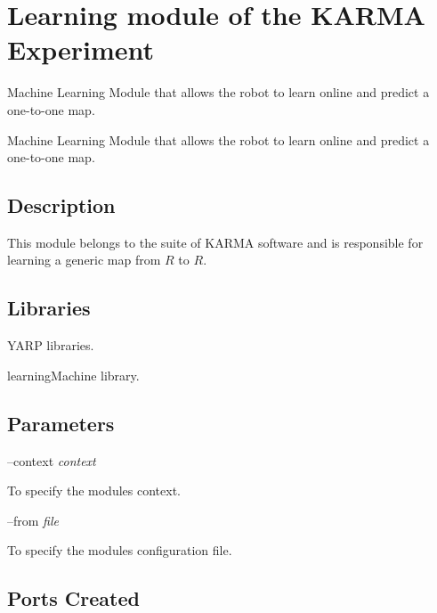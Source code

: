 \section{Learning module of the K\+A\+R\+MA Experiment}
\label{group__karmaLearn}


Machine Learning Module that allows the robot to learn online and predict a one-\/to-\/one map.  


Machine Learning Module that allows the robot to learn online and predict a one-\/to-\/one map. 

\hypertarget{group__karmaToolProjection_intro_sec}{}\subsection{Description}\label{group__karmaToolProjection_intro_sec}
This module belongs to the suite of K\+A\+R\+MA software and is responsible for learning a generic map from $ R $ to $ R $.\hypertarget{group__karmaToolProjection_lib_sec}{}\subsection{Libraries}\label{group__karmaToolProjection_lib_sec}

\begin{DoxyItemize}
\item Y\+A\+RP libraries.
\item learning\+Machine library.
\end{DoxyItemize}\hypertarget{group__karmaToolProjection_parameters_sec}{}\subsection{Parameters}\label{group__karmaToolProjection_parameters_sec}
--context {\itshape context} 
\begin{DoxyItemize}
\item To specify the module\textquotesingle{}s context.
\end{DoxyItemize}

--from {\itshape file} 
\begin{DoxyItemize}
\item To specify the module\textquotesingle{}s configuration file.
\end{DoxyItemize}\hypertarget{group__karmaToolProjection_portsc_sec}{}\subsection{Ports Created}\label{group__karmaToolProjection_portsc_sec}

